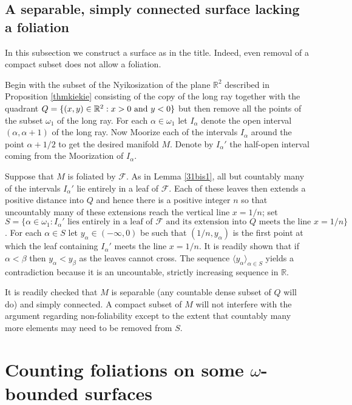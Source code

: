 \documentclass{amsart}
\begin{document}
\subsection{A separable, simply connected surface lacking a foliation}\label{sep-simplconn-nofol}
In this subsection we construct a surface as in the title. Indeed, even removal of a compact subset does not allow a foliation.

Begin with the subset of the Nyikosization of the plane ${\mathbb R}^2$ described in Proposition \ref{thmkiekie} consisting of the copy of the long ray together with the quadrant $Q=\{(x,y)\in{\mathbb R}^2 : x>0 {\rm\ and\ } y<0\}$ but then remove all the points of the subset $\omega_1$ of the long ray. For each $\alpha\in\omega_1$ let $I_\alpha$ denote the open interval $(\alpha,\alpha+1)$ of the long ray. Now Moorize each of the intervals $I_\alpha$ around the point $\alpha + 1/2$ to get the desired manifold $M$. Denote by $I_\alpha'$ the half-open interval coming from the Moorization of $I_\alpha$.

Suppose that $M$ is foliated by $\mathcal F$. As in Lemma \ref{31bis1}, all but countably many of the intervals $I_\alpha'$ lie entirely in a leaf of $\mathcal F$. Each of these leaves then extends a positive distance into $Q$ and hence there is a positive integer $n$ so that uncountably many of these extensions reach the vertical line $x=1/n$; set $S=\{\alpha\in\omega_1 : I_\alpha' \mbox{ lies entirely in a leaf of } \mathcal F \mbox{ and its extension into } Q \mbox{ meets the line } x=1/n\}$. For each $\alpha\in S$ let $y_\alpha\in(-\infty,0)$ be such that $(1/n,y_\alpha)$ is the first point at which the leaf containing $I_\alpha'$ meets the line $x=1/n$. It is readily shown that if $\alpha<\beta$ then $y_\alpha<y_\beta$ as the leaves cannot cross. The sequence $\langle y_\alpha\rangle_{\alpha\in S}$ yields a contradiction because it is an uncountable, strictly increasing sequence in ${\mathbb R}$.

It is readily checked that $M$ is separable (any countable dense subset of $Q$ will do) and simply connected. A compact subset of $M$ will not interfere with the argument regarding non-foliability except to the extent that countably many more elements may need to be removed from $S$.

\section{Counting foliations on some $\omega$-bounded surfaces}
\end{document}
